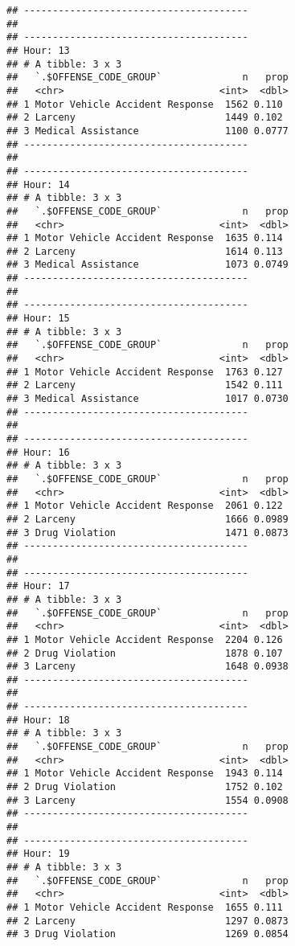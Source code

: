 \documentclass[]{article}
\begin{document}
\begin{verbatim}
## ---------------------------------------
## 
## ---------------------------------------
## Hour: 13
## # A tibble: 3 x 3
##   `.$OFFENSE_CODE_GROUP`              n   prop
##   <chr>                           <int>  <dbl>
## 1 Motor Vehicle Accident Response  1562 0.110 
## 2 Larceny                          1449 0.102 
## 3 Medical Assistance               1100 0.0777
## ---------------------------------------
## 
## ---------------------------------------
## Hour: 14
## # A tibble: 3 x 3
##   `.$OFFENSE_CODE_GROUP`              n   prop
##   <chr>                           <int>  <dbl>
## 1 Motor Vehicle Accident Response  1635 0.114 
## 2 Larceny                          1614 0.113 
## 3 Medical Assistance               1073 0.0749
## ---------------------------------------
## 
## ---------------------------------------
## Hour: 15
## # A tibble: 3 x 3
##   `.$OFFENSE_CODE_GROUP`              n   prop
##   <chr>                           <int>  <dbl>
## 1 Motor Vehicle Accident Response  1763 0.127 
## 2 Larceny                          1542 0.111 
## 3 Medical Assistance               1017 0.0730
## ---------------------------------------
## 
## ---------------------------------------
## Hour: 16
## # A tibble: 3 x 3
##   `.$OFFENSE_CODE_GROUP`              n   prop
##   <chr>                           <int>  <dbl>
## 1 Motor Vehicle Accident Response  2061 0.122 
## 2 Larceny                          1666 0.0989
## 3 Drug Violation                   1471 0.0873
## ---------------------------------------
## 
## ---------------------------------------
## Hour: 17
## # A tibble: 3 x 3
##   `.$OFFENSE_CODE_GROUP`              n   prop
##   <chr>                           <int>  <dbl>
## 1 Motor Vehicle Accident Response  2204 0.126 
## 2 Drug Violation                   1878 0.107 
## 3 Larceny                          1648 0.0938
## ---------------------------------------
## 
## ---------------------------------------
## Hour: 18
## # A tibble: 3 x 3
##   `.$OFFENSE_CODE_GROUP`              n   prop
##   <chr>                           <int>  <dbl>
## 1 Motor Vehicle Accident Response  1943 0.114 
## 2 Drug Violation                   1752 0.102 
## 3 Larceny                          1554 0.0908
## ---------------------------------------
## 
## ---------------------------------------
## Hour: 19
## # A tibble: 3 x 3
##   `.$OFFENSE_CODE_GROUP`              n   prop
##   <chr>                           <int>  <dbl>
## 1 Motor Vehicle Accident Response  1655 0.111 
## 2 Larceny                          1297 0.0873
## 3 Drug Violation                   1269 0.0854

\end{verbatim}
\end{document}
